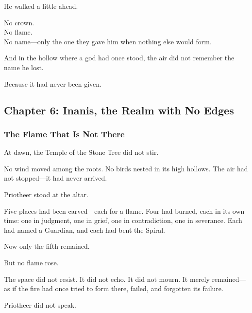 \documentclass[12pt]{article}
\begin{document}
\vspace{0.5em}
He walked a little ahead.

\vspace{0.5em}
No crown.\\
No flame.\\
No name---only the one they gave him when nothing else would form.

\vspace{0.5em}
And in the hollow where a god had once stood, the air did not remember the name he lost.

\vspace{0.5em}
Because it had never been given.

\newpage

\subsection{Chapter 6: Inanis, the Realm with No Edges}

\vspace{.5in}

\subsubsection{The Flame That Is Not There}

At dawn, the Temple of the Stone Tree did not stir.

\vspace{0.5em}
No wind moved among the roots. No birds nested in its high hollows. The air had not stopped---it had never arrived.

\vspace{0.5em}
Priotheer stood at the altar.

\vspace{0.5em}
Five places had been carved---each for a flame. Four had burned, each in its own time: one in judgment, one in grief, one in contradiction, one in severance. Each had named a Guardian, and each had bent the Spiral.

\vspace{0.5em}
Now only the fifth remained.

\vspace{0.5em}
But no flame rose.

\vspace{0.5em}
The space did not resist. It did not echo. It did not mourn. It merely remained---as if the fire had once tried to form there, failed, and forgotten its failure.

\vspace{0.5em}
Priotheer did not speak.
\end{document}
